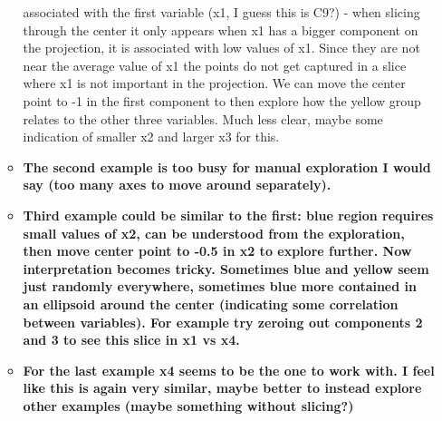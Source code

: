 \documentclass[]{interact}
\theoremstyle{plain}%
\theoremstyle{definition}
\theoremstyle{remark}
\begin{document}
\begin{itemize}
\begin{itemize}
{    associated with the first variable (x1, I guess this is C9?) - when
    slicing through the center it only appears when x1 has a bigger
    component on the projection, it is associated with low values of x1.
    Since they are not near the average value of x1 the points do not
    get captured in a slice where x1 is not important in the projection.
    We can move the center point to -1 in the first component to then
    explore how the yellow group relates to the other three variables.
    Much less clear, maybe some indication of smaller x2 and larger x3
    for this.}
  \item
    \textbf{The second example is too busy for manual exploration I
    would say (too many axes to move around separately).}
  \item
    \textbf{Third example could be similar to the first: blue region
    requires small values of x2, can be understood from the exploration,
    then move center point to -0.5 in x2 to explore further. Now
    interpretation becomes tricky. Sometimes blue and yellow seem just
    randomly everywhere, sometimes blue more contained in an ellipsoid
    around the center (indicating some correlation between variables).
    For example try zeroing out components 2 and 3 to see this slice in
    x1 vs x4.}
  \item
    \textbf{For the last example x4 seems to be the one to work with. I
    feel like this is again very similar, maybe better to instead
    explore other examples (maybe something without slicing?)}
  \end{itemize}
\end{itemize}
\end{document}
